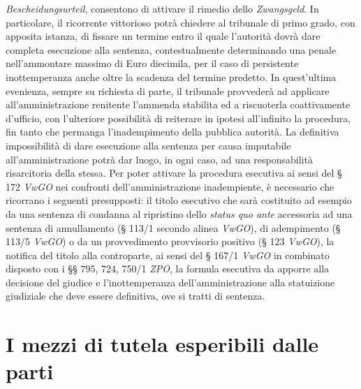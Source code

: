 \documentclass[12pt,it,a4paper,]{report}
\begin{document}
\emph{Bescheidungsurteil}, consentono di attivare il rimedio dello
\emph{Zwangsgeld}. In particolare, il ricorrente vittorioso potrà
chiedere al tribunale di primo grado, con apposita istanza, di fissare
un termine entro il quale l'autorità dovrà dare completa esecuzione alla
sentenza, contestualmente determinando una penale nell'ammontare massimo
di Euro diecimila, per il caso di persistente inottemperanza anche oltre
la scadenza del termine predetto. In quest'ultima evenienza, sempre su
richiesta di parte, il tribunale provvederà ad applicare
all'amministrazione renitente l'ammenda stabilita ed a riscuoterla
coattivamente d'ufficio, con l'ulteriore possibilità di reiterare in
ipotesi all'infinito la procedura, fin tanto che permanga
l'inadempimento della pubblica autorità. La definitiva impossibilità di
dare esecuzione alla sentenza per causa imputabile all'amministrazione
potrà dar luogo, in ogni caso, ad una responsabilità risarcitoria della
stessa. Per poter attivare la procedura esecutiva ai sensi del § 172
\emph{VwGO} nei confronti dell'amministrazione inadempiente, è
necessario che ricorrano i seguenti presupposti: il titolo esecutivo che
sarà costituito ad esempio da una sentenza di condanna al ripristino
dello \emph{status quo ante} accessoria ad una sentenza di annullamento
(§ 113/1 secondo alinea \emph{VwGO}), di adempimento (§ 113/5
\emph{VwGO}) o da un provvedimento provvisorio positivo (§ 123
\emph{VwGO}), la notifica del titolo alla controparte, ai sensi del §
167/1 \emph{VwGO} in combinato disposto con i §§ 795, 724, 750/1
\emph{ZPO}, la formula esecutiva da apporre alla decisione del giudice e
l'inottemperanza dell'amministrazione alla statuizione giudiziale che
deve essere definitiva, ove si tratti di sentenza.

\hypertarget{i-mezzi-di-tutela-esperibili-dalle-parti}{%
\section{I mezzi di tutela esperibili dalle
parti}\label{i-mezzi-di-tutela-esperibili-dalle-parti}}
\end{document}
